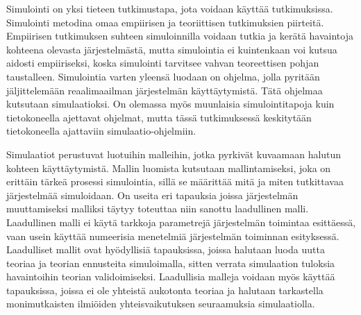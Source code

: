 \documentclass[utf8]{gradu3}
\begin{document}
\begin{comment}
Mietin kappaleen logiikkaa. tavallaan määrällinen tutkimus on suhteellisen selkeä. Laadullinen on sitten vähän sen komplementtia. Lisäksi varsinkaan tässä työssä et tule rajaamana laadullista subjektiivisiin kokemuksiin jne. Olisiko iso kuva se, että määrällisessä tutkimuksessa tulos lopulta pyritään esittämään lukuina ja niiden virherajoina. Jos ei pystytä esittämään lukja tai niiden virherajoja, tulos ei ole määrällinen vaan laadullinen. Onko vaikka havaittu trendi, joka ei ole tilastollisesti merkittävä vielä määrällnen tulos vai vain laadullinen.
\end{comment}
Simulointi on yksi tieteen tutkimustapa, jota voidaan käyttää tutkimuksissa.
Simulointi metodina omaa empiirisen ja teoriittisen tutkimuksien piirteitä.
Empiirisen tutkimuksen suhteen simuloinnilla voidaan tutkia ja kerätä havaintoja
kohteena olevasta järjestelmästä, mutta simulointia ei 
kuintenkaan voi kutsua aidosti empiiriseksi,
koska simulointi tarvitsee vahvan teoreettisen pohjan taustalleen.
Simulointia varten yleensä luodaan on ohjelma, 
jolla pyritään jäljittelemään reaalimaailman järjestelmän käyttäytymistä.
Tätä ohjelmaa kutsutaan simulaatioksi.
On olemassa myös muunlaisia simulointitapoja kuin tietokoneella ajettavat ohjelmat, mutta 
tässä tutkimuksessä keskitytään tietokoneella ajattaviin simulaatio-ohjelmiin.

\begin{comment}
    Määrällisetkin simulaatiot perustuvat yleensä numeerisiin menetelmiin, joten tämä virke ei avaa asiaa parhaalla tavalla. Sanallistaisin enemmän funktionaalisten riippuvuuksien kuin parametrien kautta. Saattaa olla, että kahden systeemimuuttujan riippuvuudesta tunnetaan vain laadullisia piirteitä - esimerkiksi kasvava funktio joka on kuitenkin aidosti rajoitettu mutta tarkasta riippuvuudesta ei ole riittävän tarkkoja havaintoja. Pohdin myös seuraavaa virkettä havaintoihin vertaamisesta. Laadullisessa tapauksessa ei voi verrata havaintoihin tarkasti mutta voi olla mahdollista selittää, voiko jokin mekanismi tuottaa kuvitellun/havaitun käyttäytymisen jossakin tapauksessa.. Milloin näin tapahtuisi tarkasti, edellyttäisi sitten tarkempaa määrällistä mallia. 
\end{comment}
Simulaatiot perustuvat luotuihin malleihin, 
jotka pyrkivät kuvaamaan halutun kohteen käyttäytymistä. 
Mallin luomista kutsutaan mallintamiseksi, joka on erittäin tärkeä prosessi simulointia,
sillä se määrittää mitä ja miten tutkittavaa järjestelmää simuloidaan. On useita eri tapauksia joissa järjestelmän muuttamiseksi malliksi täytyy toteuttaa niin sanottu laadullinen malli. Laadullinen malli ei käytä tarkkoja parametrejä järjestelmän toimintaa
esittäessä, vaan usein käyttää numeerisia menetelmiä järjestelmän toiminnan esityksessä.
Laadulliset mallit ovat hyödyllisiä tapauksissa, joissa halutaan luoda uutta teoriaa ja teorian ennusteita simuloimalla, sitten verrata simulaation tuloksia havaintoihin teorian validoimiseksi. 
Laadullisia malleja voidaan myös käyttää tapauksissa, joissa ei ole yhteistä aukotonta teoriaa ja halutaan tarkastella monimutkaisten ilmiöiden yhteisvaikutuksen seuraamuksia simulaatiolla.
\end{document}
